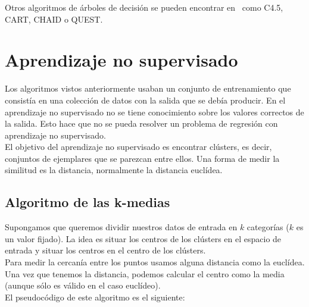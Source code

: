Otros algoritmos de árboles de decisión se pueden encontrar en~\cite{Rokach:2008:DMD:1796114} como C4.5, CART, CHAID o QUEST.

\section{Aprendizaje no supervisado}

Los algoritmos vistos anteriormente usaban un conjunto de entrenamiento que consistía en una colección de datos con la salida que se debía producir. En el aprendizaje no supervisado no se tiene conocimiento sobre los valores correctos de la salida. Esto hace que no se pueda resolver un problema de regresión con aprendizaje no supervisado.\\

El objetivo del aprendizaje no supervisado es encontrar clústers, es decir, conjuntos de ejemplares que se parezcan entre ellos. Una forma de medir la similitud es la distancia, normalmente la distancia euclídea.

\subsection{Algoritmo de las k-medias}

Supongamos que queremos dividir nuestros datos de entrada en $k$ categorías ($k$ es un valor fijado). La idea es situar los centros de los clústers en el espacio de entrada y situar los centros en el centro de los clústers.\\

Para medir la cercanía entre los puntos usamos alguna distancia como la euclídea. Una vez que tenemos la distancia, podemos calcular el centro como la media (aunque sólo es válido en el caso euclídeo).\\

El pseudocódigo de este algoritmo es el siguiente:

